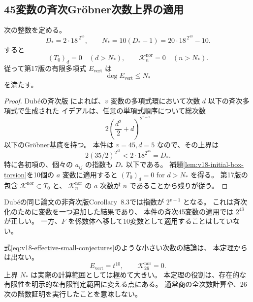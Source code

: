 \subsection{45変数の斉次Gr\"obner次数上界の適用}

\begin{theorem}[有限頂点部分の明示上界]
\label{thm:v18-effective-vertex-cutoff}
次の整数を定める。
\begin{equation}\label{eq:v18-effective-cutoff-definition}
 D_*=2\cdot18^{\,2^{43}},\qquad
 N_*=10(D_*-1)=20\cdot18^{\,2^{43}}-10.
\end{equation}
すると
\[
 (T_0)_d=0\quad(d>N_*),\qquad
 \mathcal K_n^{\mathrm{nor}}=0\quad(n>N_*).
\]
従って第17版の有限多項式 $E_{\mathrm{vert}}$ は
\begin{equation}\label{eq:v18-Evert-explicit-degree}
 \deg E_{\mathrm{vert}}\le N_*
\end{equation}
を満たす。
\end{theorem}

\begin{proof}
Dub\'eの斉次版\cite[Theorem~8.2, p.~773]{Dube1990}
によれば、$v$ 変数の多項式環において次数 $d$ 以下の斉次多項式で生成された
イデアルは、任意の単項式順序について総次数
\[
 2\left(\frac{d^2}{2}+d\right)^{2^{v-2}}
\]
以下のGr\"obner基底を持つ。
本件は $v=45,d=5$ なので、その上界は
\[
 2(35/2)^{2^{43}}<2\cdot18^{2^{43}}=D_*.
\]
特に各初項の、個々の $a_{ij}$ の指数も $D_*$ 以下である。
補題\ref{lem:v18-initial-box-torsion}を10個の $a$ 変数に適用すると
$(T_0)_d=0$ for $d>N_*$ を得る。
第17版の包含 $\mathcal K^{\mathrm{nor}}\subset T_0$ と、
$\mathcal K_n^{\mathrm{nor}}$ の $a$ 次数が $n$ であることから残りが従う。
\end{proof}

\begin{remark}[指数と実用性の監査]
Dub\'eの同じ論文の非斉次版Corollary~8.3では指数が $2^{v-1}$ となる。
これは斉次化のために変数を一つ追加した結果であり、
本件の斉次45変数の適用では $2^{43}$ が正しい。
一方、$F$ を係数体へ移して10変数として適用することはしていない。

式\eqref{eq:v18-effective-small-conjectures}のような小さい次数の結論は、
本定理からは出ない。
\begin{equation}\label{eq:v18-effective-small-conjectures}
 E_{\mathrm{vert}}=t^{10},\qquad
 \mathcal K_{26}^{\mathrm{nor}}=0.
\end{equation}
上界 $N_*$ は実際の計算範囲としては極めて大きい。
本定理の役割は、存在的な有限性を明示的な有限判定範囲に変える点にある。
通常商の全次数計算や、26次の階数証明を実行したことを意味しない。
\end{remark}

